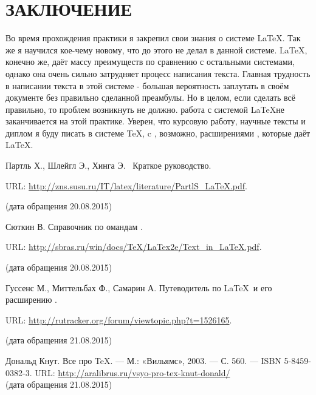 \documentclass[a4paper,14pt,russian]{extreport}
\begin{document}
\chapter*{ЗАКЛЮЧЕНИЕ}
	\par Во время прохождения практики я закрепил свои знания о системе \LaTeX. Так же я научился кое-чему новому, что до этого не делал в данной системе. 
	 \LaTeX , конечно же, даёт массу преимуществ по сравнению с остальными системами, однако она очень сильно затрудняет процесс написания текста. Главная трудность в написании текста в этой системе - большая вероятность заплутать в своём документе без правильно сделанной преамбулы. Но в целом, если сделать всё правильно, то проблем возникнуть не должно. 
	 работа с системой \LaTeX не заканчивается на этой практике. Уверен, что курсовую работу, научные тексты и диплом я буду писать в системе \TeX, c , возможно, расширениями , которые даёт \LaTeX.



\def\bibname{СПИСОК ИСПОЛЬЗОВАННЫХ ИСТОЧНИКОВ} %
\begin{center}

\renewcommand{\refname}{СПИСОК ИСПОЛЬЗОВАННЫХ ИСТОЧНИКОВ}
\begin{thebibliography}{99}

Партль Х., Шлейгл Э., Хинга Э. \LaTeXe\ Краткое руководство.

URL: \url{http://zns.susu.ru/IT/latex/literature/PartlS_LaTeX.pdf}. 

(дата обращения 20.08.2015)

Сюткин В. Справочник по омандам \LaTeXe.

URL: \url{http://sbras.ru/win/docs/TeX/LaTex2e/Text_in_LaTeX.pdf}. 

(дата обращения 20.08.2015)

Гуссенс М., Миттельбах Ф., Самарин А. Путеводитель по \LaTeX\ и его расширению \LaTeXe.

URL: \url{http://rutracker.org/forum/viewtopic.php?t=1526165}. 

(дата обращения 21.08.2015)

Дональд Кнут. Все про TeX. — М.: «Вильямс», 2003. — С. 560. — ISBN 5-8459-0382-3.
URL: \url{http://aralibrus.ru/vsyo-pro-tex-knut-donald/}
\\ (дата обращения 21.08.2015)

\end{thebibliography}
\end{center}
\end{document}

